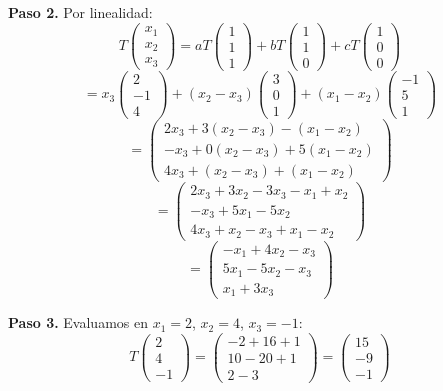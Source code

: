 \begin{prob}
\begin{myproof}
\textbf{Paso 2.} Por linealidad:
\[
T\begin{pmatrix} x_1 \\ x_2 \\ x_3 \end{pmatrix} = a T\begin{pmatrix} 1 \\ 1 \\ 1 \end{pmatrix} + b T\begin{pmatrix} 1 \\ 1 \\ 0 \end{pmatrix} + c T\begin{pmatrix} 1 \\ 0 \\ 0 \end{pmatrix}
\]
\[
= x_3 \begin{pmatrix} 2 \\ -1 \\ 4 \end{pmatrix} + (x_2 - x_3) \begin{pmatrix} 3 \\ 0 \\ 1 \end{pmatrix} + (x_1 - x_2) \begin{pmatrix} -1 \\ 5 \\ 1 \end{pmatrix}
\]
\[
= \begin{pmatrix}
2x_3 + 3(x_2 - x_3) - (x_1 - x_2) \\
- x_3 + 0(x_2 - x_3) + 5(x_1 - x_2) \\
4x_3 + (x_2 - x_3) + (x_1 - x_2)
\end{pmatrix}
\]
\[
= \begin{pmatrix}
2x_3 + 3x_2 - 3x_3 - x_1 + x_2 \\
- x_3 + 5x_1 - 5x_2 \\
4x_3 + x_2 - x_3 + x_1 - x_2
\end{pmatrix}
\]
\[
= \begin{pmatrix}
- x_1 + 4x_2 - x_3 \\
5x_1 - 5x_2 - x_3 \\
x_1 + 3x_3
\end{pmatrix}
\]

\textbf{Paso 3.} Evaluamos en $x_1 = 2$, $x_2 = 4$, $x_3 = -1$:
\[
T\begin{pmatrix} 2 \\ 4 \\ -1 \end{pmatrix} = \begin{pmatrix}
-2 + 16 + 1 \\
10 - 20 + 1 \\
2 - 3
\end{pmatrix}
= \begin{pmatrix}
15 \\
-9 \\
-1
\end{pmatrix}
\]


\end{myproof}
\end{prob}

